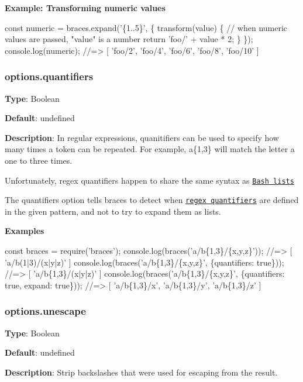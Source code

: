 {\bfseries Example\+: Transforming numeric values}


\begin{DoxyCode}
const numeric = braces.expand('\{1..5\}', \{
  transform(value) \{
    // when numeric values are passed, "value" is a number
    return 'foo/' + value * 2;
  \}
\});
console.log(numeric); 
//=> [ 'foo/2', 'foo/4', 'foo/6', 'foo/8', 'foo/10' ]
\end{DoxyCode}


\subsubsection*{options.\+quantifiers}

{\bfseries Type}\+: {\ttfamily Boolean}

{\bfseries Default}\+: {\ttfamily undefined}

{\bfseries Description}\+: In regular expressions, quanitifiers can be used to specify how many times a token can be repeated. For example, {\ttfamily a\{1,3\}} will match the letter {\ttfamily a} one to three times.

Unfortunately, regex quantifiers happen to share the same syntax as \href{#lists}{\tt Bash lists}

The {\ttfamily quantifiers} option tells braces to detect when \href{https://developer.mozilla.org/en-US/docs/Web/JavaScript/Reference/Global_Objects/RegExp#quantifiers}{\tt regex quantifiers} are defined in the given pattern, and not to try to expand them as lists.

{\bfseries Examples}


\begin{DoxyCode}
const braces = require('braces');
console.log(braces('a/b\{1,3\}/\{x,y,z\}'));
//=> [ 'a/b(1|3)/(x|y|z)' ]
console.log(braces('a/b\{1,3\}/\{x,y,z\}', \{quantifiers: true\}));
//=> [ 'a/b\{1,3\}/(x|y|z)' ]
console.log(braces('a/b\{1,3\}/\{x,y,z\}', \{quantifiers: true, expand: true\}));
//=> [ 'a/b\{1,3\}/x', 'a/b\{1,3\}/y', 'a/b\{1,3\}/z' ]
\end{DoxyCode}


\subsubsection*{options.\+unescape}

{\bfseries Type}\+: {\ttfamily Boolean}

{\bfseries Default}\+: {\ttfamily undefined}

{\bfseries Description}\+: Strip backslashes that were used for escaping from the result.

